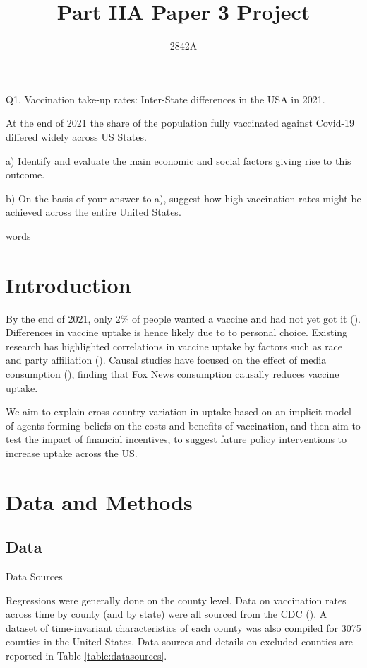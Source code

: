 \documentclass[12pt]{article}
\title{Part IIA Paper 3 Project}
\author{
	2842A
}
\newcommand\wordcount{
	\immediate\write18{texcount -sum -1 \jobname.tex > count.txt} 
	
}
\begin{document}
	\maketitle
	\begin{spacing}{1.5} %
		Q1. Vaccination take-up rates: Inter-State differences in the USA in 2021.
		
		At the end of 2021 the share of the population fully vaccinated against Covid-19 differed widely across US States.
		
		a) Identify and evaluate the main economic and social factors giving rise to this outcome.
		
		b) On the basis of your answer to a), suggest how high vaccination rates might be achieved across the entire United States.
		
		\wordcount words
		\pagebreak
		\section{Introduction}
		By the end of 2021, only 2\% of people wanted a vaccine and had not yet got it (\cite{kff_kff_2022}). Differences in vaccine uptake is hence likely due to to personal choice. Existing research has highlighted correlations in vaccine uptake by factors such as race and party affiliation (\cite{viswanath_individual_2021}). Causal studies have focused on the effect of media consumption (\cite{pinna_cable_2021}), finding that Fox News consumption causally reduces vaccine uptake.
		
		We aim to explain cross-country variation in uptake based on an implicit model of agents forming beliefs on the costs and benefits of vaccination, and then aim to test the impact of financial incentives, to suggest future policy interventions to increase uptake across the US.
		
		\section{Data and Methods}
		\subsection{Data}
		
		\begin{table}
			\caption{Data Sources}
			
			\label{table:datasources}
		\end{table}
	
		Regressions were generally done on the county level. Data on vaccination rates across time by county (and by state) were all sourced from the CDC (\cite{cdc_covid-19_2022}). A dataset of time-invariant characteristics of each county was also compiled for 3075 counties in the United States. Data sources and details on excluded counties are reported in Table \ref{table:datasources}.
		

\end{spacing}
\end{document}
